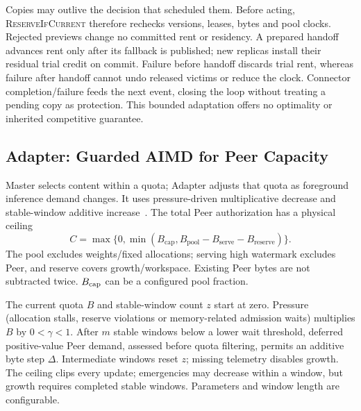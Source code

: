Copies may outlive the decision that scheduled them. Before acting,
\textsc{ReserveIfCurrent} therefore rechecks versions, leases, bytes and pool clocks.
Rejected previews change no committed rent or residency. A prepared
handoff advances rent only after its fallback is published; new replicas
install their residual trial credit on commit. Failure before handoff
discards trial rent, whereas failure after handoff cannot undo released
victims or reduce the clock. Connector completion/failure feeds the next
event, closing the loop without treating a pending copy as protection.
This bounded adaptation offers no optimality or inherited competitive guarantee.

\subsection{Adapter: Guarded AIMD for Peer Capacity}
\label{sec:adapter}

Master selects content within a quota; Adapter adjusts that quota as
foreground inference demand changes. It uses pressure-driven multiplicative
decrease and stable-window additive increase~\cite{chiu1989aimd}.
The total Peer authorization has a physical ceiling
\begin{equation}
 C=\max\{0,\min(B_{\mathrm{cap}},
 B_{\mathrm{pool}}-B_{\mathrm{serve}}-B_{\mathrm{reserve}})\}.
 \label{eq:peer-ceiling}
\end{equation}
The pool excludes weights/fixed allocations; serving high watermark
excludes Peer, and reserve covers growth/workspace. Existing Peer bytes
are not subtracted twice. $B_{\rm cap}$ can be a configured pool fraction.

The current quota $B$ and stable-window count $z$ start at zero.
Pressure (allocation stalls, reserve violations or
memory-related admission waits) multiplies $B$ by $0<\gamma<1$. After $m$
stable windows below a lower wait threshold, deferred positive-value Peer
demand, assessed before quota filtering, permits an additive byte step
$\Delta$. Intermediate windows reset
$z$; missing telemetry disables growth. The ceiling clips every update;
emergencies may decrease within a window, but growth requires completed
stable windows. Parameters and window length are configurable.

